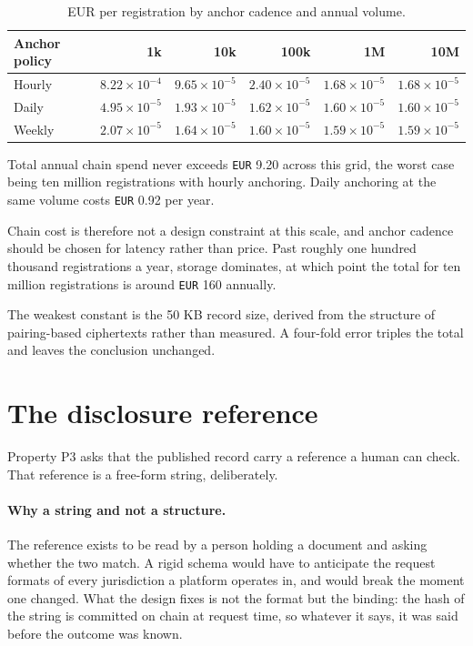 \documentclass[11pt,a4paper]{article}
\begin{document}
\begin{table}[h]
\centering
\begin{tabular}{lrrrrr}
\toprule
Anchor policy & 1k & 10k & 100k & 1M & 10M \\
\midrule
Hourly & $8.22 \times 10^{-4}$ & $9.65 \times 10^{-5}$ & $2.40 \times 10^{-5}$ & $1.68 \times 10^{-5}$ & $1.68 \times 10^{-5}$ \\
Daily  & $4.95 \times 10^{-5}$ & $1.93 \times 10^{-5}$ & $1.62 \times 10^{-5}$ & $1.60 \times 10^{-5}$ & $1.60 \times 10^{-5}$ \\
Weekly & $2.07 \times 10^{-5}$ & $1.64 \times 10^{-5}$ & $1.60 \times 10^{-5}$ & $1.59 \times 10^{-5}$ & $1.59 \times 10^{-5}$ \\
\bottomrule
\end{tabular}
\caption{EUR per registration by anchor cadence and annual volume.}
\label{tab:costgrid}
\end{table}

Total annual chain spend never exceeds \texttt{EUR} 9.20 across this grid, the
worst case being ten million registrations with hourly anchoring. Daily anchoring
at the same volume costs \texttt{EUR} 0.92 per year.

Chain cost is therefore not a design constraint at this scale, and anchor cadence
should be chosen for latency rather than price. Past roughly one hundred thousand
registrations a year, storage dominates, at which point the total for ten million
registrations is around \texttt{EUR} 160 annually.

The weakest constant is the 50 KB record size, derived from the structure of
pairing-based ciphertexts rather than measured. A four-fold error triples the
total and leaves the conclusion unchanged.

\section{The disclosure reference}

Property P3 asks that the published record carry a reference a human can check.
That reference is a free-form string, deliberately.

\paragraph{Why a string and not a structure.} The reference exists to be read by
a person holding a document and asking whether the two match. A rigid schema
would have to anticipate the request formats of every jurisdiction a platform
operates in, and would break the moment one changed. What the design fixes is not
the format but the binding: the hash of the string is committed on chain at
request time, so whatever it says, it was said before the outcome was known.
\end{document}
